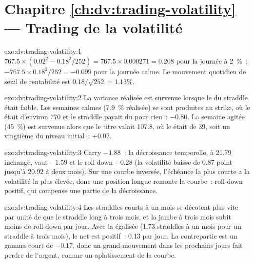 \section*{Chapitre \ref{ch:dv:trading-volatility} --- Trading de la volatilité}

\begin{solution}{exo:dv:trading-volatility:1}
$767.5\times(0.02^2-0.18^2/252)=767.5\times0.000271=0.208$ pour la journée à 2~\%~; $-767.5\times0.18^2/252=-0.099$ pour la journée calme. Le mouvement quotidien
de seuil de rentabilité est $0.18/\sqrt{252}=1.13\%$.
\end{solution}

\begin{solution}{exo:dv:trading-volatility:2}
La variance réalisée est survenue lorsque le  du straddle était faible. Les semaines calmes (7.9~\% réalisée) se sont produites au strike, où le  était
d'environ 770 et le straddle payait du  pour rien~: $-0.80$. La semaine agitée (45~\%) est survenue alors que le titre valait 107.8, où le  était de 39, soit
un vingtième du niveau initial~: $+0.02$.
\end{solution}

\begin{solution}{exo:dv:trading-volatility:3}
Carry $-1.88$~: la décroissance temporelle, à 21.79 inchangé, vaut $-1.59$ et le roll-down $-0.28$ (la volatilité baisse de 0.87 point jusqu'à 20.92 à deux mois). Sur une
courbe inversée, l'échéance la plus courte a la volatilité la plus élevée, donc une position longue remonte la courbe~: roll-down positif, qui compense une partie de la décroissance.
\end{solution}

\begin{solution}{exo:dv:trading-volatility:4}
Les straddles courts à un mois se décotent plus vite par unité de  que le straddle long à trois mois, et la jambe à trois mois subit moins de roll-down par jour. Avec
la  égalisée (1.73 straddles à un mois pour un straddle à trois mois), le  net est positif~: 0.13 par jour. La contrepartie est un gamma court de $-0.17$, donc
un grand mouvement dans les prochains jours fait perdre de l'argent, comme un aplatissement de la courbe.
\end{solution}

